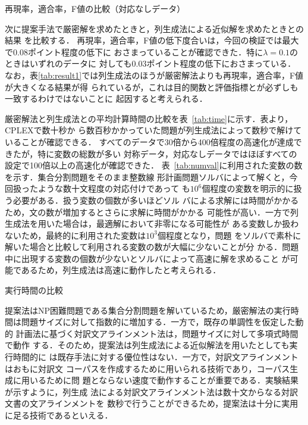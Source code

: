 \documentclass[japanese]{jnlp_1.4}
\begin{document}
\begin{table}[t]
\caption{再現率，適合率，F値の比較（対応なしデータ）}
\label{tab:result3}

\end{table}

次に提案手法で厳密解を求めたときと，列生成法による近似解を求めたときとの結果
を比較する．
再現率，適合率，F値の低下度合いは，今回の検証では最大で$0.08$ポイント程度の低下に
おさまっていることが確認できた．特に$\lambda = 0.1$のときはいずれのデータに
対しても$0.03$ポイント程度の低下におさまっている．
なお，表\ref{tab:result1}では列生成法のほうが厳密解法よりも再現率，適合率，F値が大きくなる結果が得
られているが，これは目的関数と評価指標とが必ずしも一致するわけではないことに
起因すると考えられる．


厳密解法と列生成法との平均計算時間の比較を表~\ref{tab:time}に示す．表より，CPLEXで数十秒か
ら数百秒かかっていた問題が列生成法によって数秒で解けていることが確認できる．
すべてのデータで30倍から400倍程度の高速化が達成できたが，特に変数の総数が多い
対称データ，対応なしデータではほぼすべての設定で100倍以上の高速化が確認できた．
表~\ref{tab:numval}に利用された変数の数を示す．集合分割問題をそのまま整数線
形計画問題ソルバによって解くと，今回扱ったような数十文程度の対応付けであって
も$10^{6}$個程度の変数を明示的に扱う必要がある．扱う変数の個数が多いほどソル
バによる求解には時間がかかるため，文の数が増加するとさらに求解に時間がかかる
可能性が高い．一方で列生成法を用いた場合は，最適解において非零になる可能性が
ある変数しか扱わないため，最終的に利用された変数は$10^{3}$個程度となり，問題
をソルバで素朴に解いた場合と比較して利用される変数の数が大幅に少ないことが分
かる．問題中に出現する変数の個数が少ないとソルバによって高速に解を求めること
が可能であるため，列生成法は高速に動作したと考えられる．

\begin{table}[t]
\caption{実行時間の比較}
\label{tab:time}

\end{table}

提案法はNP困難問題である集合分割問題を解いているため，厳密解法の実行時
  間は問題サイズに対して指数的に増加する．一方で，既存の単調性を仮定した動的
  計画法に基づく対訳文アラインメント法は，問題サイズに対して多項式時間で動作
  する．そのため，提案法は列生成法による近似解法を用いたとしても実行時間的に
  は既存手法に対する優位性はない．一方で，対訳文アラインメントはおもに対訳文
  コーパスを作成するために用いられる技術であり，コーパス生成に用いるために問
  題とならない速度で動作することが重要である．実験結果が示すように，列生成
  法による対訳文アラインメント法は数十文からなる対訳文書の文アラインメントを
  数秒で行うことができるため，提案法は十分に実用に足る技術であるといえる．
\end{document}
